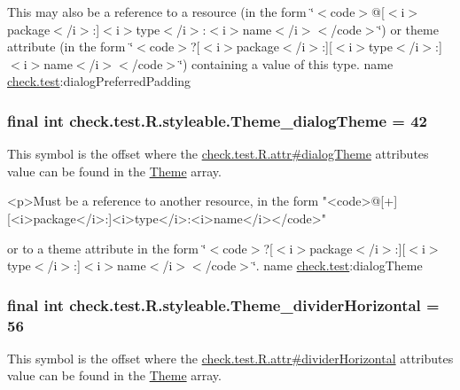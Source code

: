 This may also be a reference to a resource (in the form \char`\"{}$<$code$>$@\mbox{[}$<$i$>$package$<$/i$>$\+:\mbox{]}$<$i$>$type$<$/i$>$\+:$<$i$>$name$<$/i$>$$<$/code$>$\char`\"{}) or theme attribute (in the form \char`\"{}$<$code$>$?\mbox{[}$<$i$>$package$<$/i$>$\+:\mbox{]}\mbox{[}$<$i$>$type$<$/i$>$\+:\mbox{]}$<$i$>$name$<$/i$>$$<$/code$>$\char`\"{}) containing a value of this type.  name \hyperlink{namespacecheck_1_1test}{check.\+test}\+:dialog\+Preferred\+Padding \hypertarget{classcheck_1_1test_1_1_r_1_1styleable_a25fd3dc52a7a1eab045aeadf0e4aa6c6}{}
\subsubsection[{Theme\+\_\+dialog\+Theme}]{\setlength{\rightskip}{0pt plus 5cm}final int check.\+test.\+R.\+styleable.\+Theme\+\_\+dialog\+Theme = 42\hspace{0.3cm}{\ttfamily [static]}}\label{classcheck_1_1test_1_1_r_1_1styleable_a25fd3dc52a7a1eab045aeadf0e4aa6c6}
This symbol is the offset where the \hyperlink{classcheck_1_1test_1_1_r_1_1attr_a3ea5dd752e953db06c68789665c1627c}{check.\+test.\+R.\+attr\#dialog\+Theme} attribute\textquotesingle{}s value can be found in the \hyperlink{classcheck_1_1test_1_1_r_1_1styleable_acca726d02016a0cf607782ec3a436a81}{Theme} array.

\begin{DoxyVerb}      <p>Must be a reference to another resource, in the form "<code>@[+][<i>package</i>:]<i>type</i>:<i>name</i></code>"
\end{DoxyVerb}
 or to a theme attribute in the form \char`\"{}$<$code$>$?\mbox{[}$<$i$>$package$<$/i$>$\+:\mbox{]}\mbox{[}$<$i$>$type$<$/i$>$\+:\mbox{]}$<$i$>$name$<$/i$>$$<$/code$>$\char`\"{}.  name \hyperlink{namespacecheck_1_1test}{check.\+test}\+:dialog\+Theme \hypertarget{classcheck_1_1test_1_1_r_1_1styleable_acd0c530f019a2431d54c833109966ffb}{}
\subsubsection[{Theme\+\_\+divider\+Horizontal}]{\setlength{\rightskip}{0pt plus 5cm}final int check.\+test.\+R.\+styleable.\+Theme\+\_\+divider\+Horizontal = 56\hspace{0.3cm}{\ttfamily [static]}}\label{classcheck_1_1test_1_1_r_1_1styleable_acd0c530f019a2431d54c833109966ffb}
This symbol is the offset where the \hyperlink{classcheck_1_1test_1_1_r_1_1attr_a0331309a711a60ee0f22b5e718215f7a}{check.\+test.\+R.\+attr\#divider\+Horizontal} attribute\textquotesingle{}s value can be found in the \hyperlink{classcheck_1_1test_1_1_r_1_1styleable_acca726d02016a0cf607782ec3a436a81}{Theme} array.


